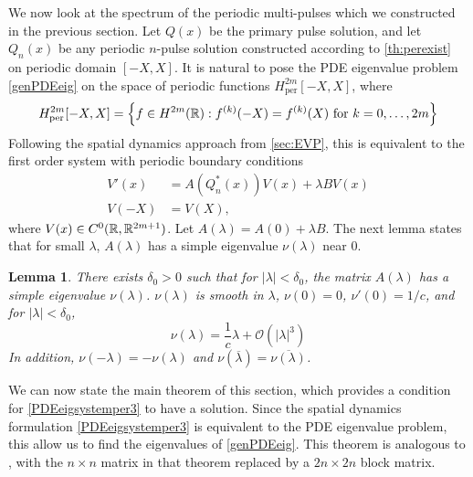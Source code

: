 \documentclass[10pt,reqno]{amsart}
\theoremstyle{plain}
\newtheorem{lemma}[theorem]{Lemma}
\theoremstyle{definition}
\theoremstyle{remark}
\numberwithin{theorem}{section}
\numberwithin{equation}{section}
\begin{document}
We now look at the spectrum of the periodic multi-pulses which we constructed in the previous section. Let $Q(x)$ be the primary pulse solution, and let $Q_n(x)$ be any periodic $n$-pulse solution constructed according to \cref{th:perexist} on periodic domain $[-X, X]$. It is natural to pose the PDE eigenvalue problem \cref{genPDEeig} on the space of periodic functions $H^{2m}_{\text{per}}[-X,X]$, where
\[
H^{2m}_{\text{per}}[-X,X] = \left\{ f \in H^{2m}(\mathbb{R}) : f^{(k)}(-X) = f^{(k)}(X) \text{ for } k = 0, \dots, 2m \right\} 
\]
Following the spatial dynamics approach from \cref{sec:EVP}, this is equivalent to the first order system with periodic boundary conditions
\begin{equation}\label{PDEeigsystemper3}
\begin{aligned}
V'(x) &= A(Q_n^*(x))V(x) + \lambda B V(x) \\
V(-X) &= V(X),
\end{aligned}
\end{equation}
where $V(x) \in C^0(\mathbb{R},\mathbb{R}^{2m+1})$. Let $A(\lambda) = A(0) + \lambda B$. The next lemma states that for small $\lambda$, $A(\lambda)$ has a simple eigenvalue $\nu(\lambda)$ near 0.

\begin{lemma}\label{nulambdalemma}
There exists $\delta_0 > 0$ such that for $|\lambda| < \delta_0$, the matrix $A(\lambda)$ has a simple eigenvalue $\nu(\lambda)$. $\nu(\lambda)$ is smooth in $\lambda$, $\nu(0) = 0$, $\nu'(0) = 1/c$, and for $|\lambda| < \delta_0$,
\begin{equation}\label{nulambda}
\nu(\lambda) = \frac{1}{c} \lambda + \mathcal{O}(|\lambda|^3)
\end{equation}
In addition, $\nu(-\lambda) = -\nu(\lambda)$ and $\nu(\overline{\lambda}) = \overline{\nu(\lambda)}$.
\end{lemma}

We can now state the main theorem of this section, which provides a condition for \cref{PDEeigsystemper3} to have a solution. Since the spatial dynamics formulation \cref{PDEeigsystemper3} is equivalent to the PDE eigenvalue problem, this allow us to find the eigenvalues of \cref{genPDEeig}. This theorem is analogous to \cite[Theorem 2]{Sandstede1998}, with the $n\times n$ matrix in that theorem replaced by a $2n\times 2n$ block matrix.
\end{document}
